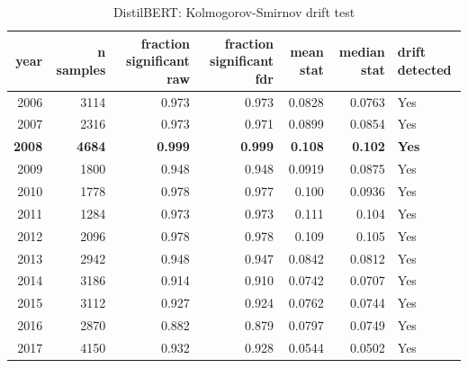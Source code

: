 \begin{table}[ht]
\centering
\caption{DistilBERT: Kolmogorov-Smirnov drift test}
\label{tab:distilbert_ks}
\begin{tabular}{rrrrrrl}
\toprule
year & n samples & fraction significant raw & fraction significant fdr & mean stat & median stat & drift detected \\
\midrule
2006 & 3114 & 0.973 & 0.973 & 0.0828 & 0.0763 & Yes \\
2007 & 2316 & 0.973 & 0.971 & 0.0899 & 0.0854 & Yes \\
\textbf{2008} & \textbf{4684} & \textbf{0.999} & \textbf{0.999} & \textbf{0.108} & \textbf{0.102} & \textbf{Yes} \\
2009 & 1800 & 0.948 & 0.948 & 0.0919 & 0.0875 & Yes \\
2010 & 1778 & 0.978 & 0.977 & 0.100 & 0.0936 & Yes \\
2011 & 1284 & 0.973 & 0.973 & 0.111 & 0.104 & Yes \\
2012 & 2096 & 0.978 & 0.978 & 0.109 & 0.105 & Yes \\
2013 & 2942 & 0.948 & 0.947 & 0.0842 & 0.0812 & Yes \\
2014 & 3186 & 0.914 & 0.910 & 0.0742 & 0.0707 & Yes \\
2015 & 3112 & 0.927 & 0.924 & 0.0762 & 0.0744 & Yes \\
2016 & 2870 & 0.882 & 0.879 & 0.0797 & 0.0749 & Yes \\
2017 & 4150 & 0.932 & 0.928 & 0.0544 & 0.0502 & Yes \\
\bottomrule
\end{tabular}
\end{table}
